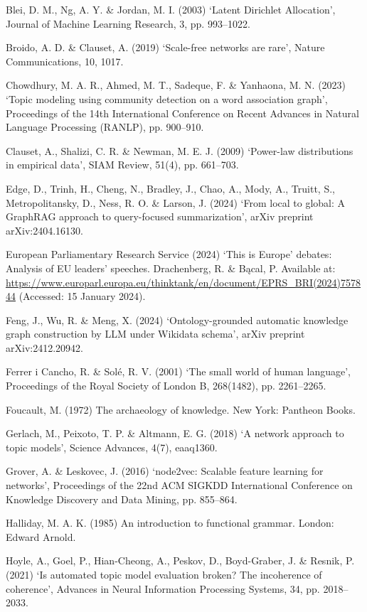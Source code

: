 \documentclass[11pt]{article}
\begin{document}
Blei, D. M., Ng, A. Y. \& Jordan, M. I. (2003) `Latent Dirichlet Allocation', Journal of Machine Learning Research, 3, pp. 993--1022.

Broido, A. D. \& Clauset, A. (2019) `Scale-free networks are rare', Nature Communications, 10, 1017.

Chowdhury, M. A. R., Ahmed, M. T., Sadeque, F. \& Yanhaona, M. N. (2023) `Topic modeling using community detection on a word association graph', Proceedings of the 14th International Conference on Recent Advances in Natural Language Processing (RANLP), pp. 900--910.

Clauset, A., Shalizi, C. R. \& Newman, M. E. J. (2009) `Power-law distributions in empirical data', SIAM Review, 51(4), pp. 661--703.

Edge, D., Trinh, H., Cheng, N., Bradley, J., Chao, A., Mody, A., Truitt, S., Metropolitansky, D., Ness, R. O. \& Larson, J. (2024) `From local to global: A GraphRAG approach to query-focused summarization', arXiv preprint arXiv:2404.16130.

European Parliamentary Research Service (2024) `This is Europe' debates: Analysis of EU leaders' speeches. Drachenberg, R. \& B\k{a}cal, P. Available at: \url{https://www.europarl.europa.eu/thinktank/en/document/EPRS\_BRI(2024)757844} (Accessed: 15 January 2024).

Feng, J., Wu, R. \& Meng, X. (2024) `Ontology-grounded automatic knowledge graph construction by LLM under Wikidata schema', arXiv preprint arXiv:2412.20942.

Ferrer i Cancho, R. \& Sol\'{e}, R. V. (2001) `The small world of human language', Proceedings of the Royal Society of London B, 268(1482), pp. 2261--2265.

Foucault, M. (1972) The archaeology of knowledge. New York: Pantheon Books.

Gerlach, M., Peixoto, T. P. \& Altmann, E. G. (2018) `A network approach to topic models', Science Advances, 4(7), eaaq1360.

Grover, A. \& Leskovec, J. (2016) `node2vec: Scalable feature learning for networks', Proceedings of the 22nd ACM SIGKDD International Conference on Knowledge Discovery and Data Mining, pp. 855--864.

Halliday, M. A. K. (1985) An introduction to functional grammar. London: Edward Arnold.

Hoyle, A., Goel, P., Hian-Cheong, A., Peskov, D., Boyd-Graber, J. \& Resnik, P. (2021) `Is automated topic model evaluation broken? The incoherence of coherence', Advances in Neural Information Processing Systems, 34, pp. 2018--2033.
\end{document}
